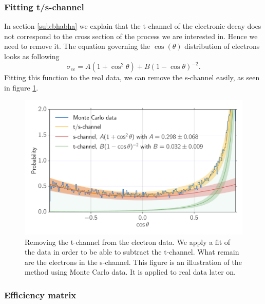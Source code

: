 \subsubsection{Fitting t/s-channel}
\label{ssub:FittingTsChannel}
In section \ref{sub:bhabha} we explain that the t-channel of the electronic decay does not correspond
to the cross section of the process we are interested in. Hence we need to remove it.  The equation governing 
the $\cos(\theta)$ distribution of electrons looks as following
\begin{equation*}
\sigma_{ee} = A(1 + \cos^2\theta) + B(1 - \cos\theta)^{-2}.
\end{equation*}
Fitting this function to the real data, we can remove the s-channel easily, as seen in figure \ref{fig:tschannel}.
\begin{figure}[htpb]
    \centering
    \includegraphics[width=1.0\linewidth]{figures/tschannel}
    \caption{Removing the t-channel from the electron data. 
        We apply a fit of the data in order to be able to subtract the t-channel. What remain are
    the electrons in the s-channel. This figure is an illustration of the method using Monte Carlo data. It is
    applied to real data later on.}
    \label{fig:tschannel}
\end{figure}
\clearpage

\subsubsection{Efficiency matrix}
\label{ssub:Efficiencymatrix}

